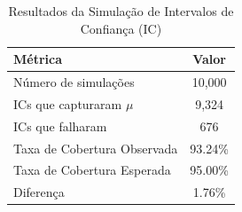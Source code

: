 \begin{table}[H]
\centering
\begin{tabular}{|l|c|}
\hline
\textbf{Métrica} & \textbf{Valor} \\
\hline
Número de simulações & 10,000 \\
\hline
ICs que capturaram $\mu$ & 9,324 \\
\hline
ICs que falharam & 676 \\
\hline
Taxa de Cobertura Observada & 93.24\% \\
\hline
Taxa de Cobertura Esperada & 95.00\% \\
\hline
Diferença & 1.76\% \\
\hline
\end{tabular}
\caption{Resultados da Simulação de Intervalos de Confiança (IC)}
\label{tab:validacao_ic}
\end{table}